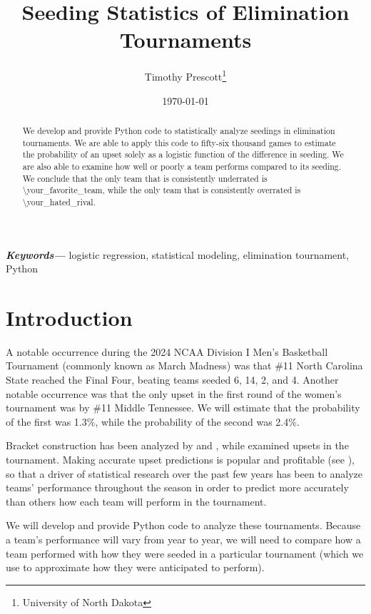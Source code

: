 \documentclass{article}
\title{Seeding Statistics of Elimination Tournaments}
\author{Timothy Prescott\footnote{University of North Dakota}}
\date{\today}
\begin{document}
\maketitle

\tableofcontents

\begin{abstract}
We develop and provide Python code to statistically analyze seedings in elimination tournaments.  We are able to apply this code to fifty-six thousand games to estimate the probability of an upset solely as a logistic function of the difference in seeding.  We are also able to examine how well or poorly a team performs compared to its seeding.  We conclude that the only team that is consistently underrated is \textbackslash your\_favorite\_team, while the only team that is consistently overrated is \textbackslash your\_hated\_rival.
\end{abstract}

\noindent
{\small\textbf{\textit{Keywords---}} logistic regression, statistical modeling, elimination tournament, Python}

\section{Introduction}
A notable occurrence during the 2024 NCAA Division I Men's Basketball Tournament (commonly known as March Madness) was that \#11 North Carolina State reached the Final Four, beating teams seeded 6, 14, 2, and 4.  Another notable occurrence was that the only upset in the first round of the women's tournament was by \#11 Middle Tennessee.  We will estimate that the probability of the first was 1.3\%, while the probability of the second was 2.4\%.

Bracket construction has been analyzed by \cite{Schwenk} and \cite{Seltzer}, while \cite{Wittry} examined upsets in the tournament.  Making accurate upset predictions is popular and profitable (see \cite{Chartier}), so that a driver of statistical research over the past few years has been to analyze teams' performance throughout the season in order to predict more accurately than others how each team will perform in the tournament.

We will develop and provide Python code to analyze these tournaments.  Because a team's performance will vary from year to year, we will need to compare how a team performed with how they were seeded in a particular tournament (which we use to approximate how they were anticipated to perform).
\end{document}
